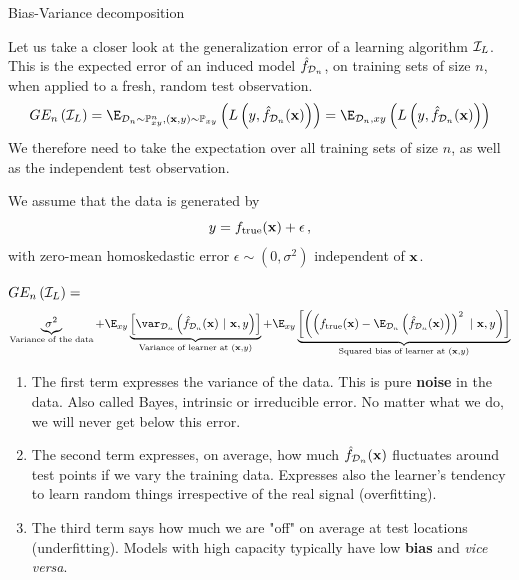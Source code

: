 \documentclass[11pt,compress,t,notes=noshow, xcolor=table]{beamer}
\begin{document}
\begin{vbframe} {Bias-Variance decomposition}

Let us take a closer look at the generalization error of a learning algorithm $\mathcal{I}_{L}$.
This is the expected error of an induced model $\hat{f}_{\mathcal{D}_n}$, on training sets of size $n$, when applied to a fresh, random test observation.
  $$GE_n\left(\ind_{L}\right) = \E_{\D_n \sim \Pxy^n, (\xv, y) \sim \Pxy}\left( L\left(y, \fh_{\D_n}(\xv)\right) \right) = \E_{\D_n, xy}\left( L\left(y, \fh_{\D_n}(\xv)\right) \right)  $$
We therefore need to take the expectation over all training sets of size $n$, as well as the independent test observation.

\lz 

We assume that the data is generated by 
$$
y = f_{\text{true}}(\mathbf{x}) + \epsilon\,,
$$
with zero-mean homoskedastic error $\epsilon \sim (0, \sigma^2)$ independent of $\mathbf{x}$.  

\framebreak 


\begin{footnotesize}
$GE_n\left(\mathcal{I}_{L}\right) =$  
$$
 \underbrace{\sigma^2}_{\text{Variance of the data}} + \E_{xy}\underbrace{\left[\var_{\D_n}\left(\fh_{\D_n}(\xv) ~|~\xv, y\right)\right]}_{\text{Variance of learner at } (\xv, y)} + \E_{xy}\underbrace{\left[\left(\left(\ftrue(\xv)-\E_{\D_n}\left(\fh_{\D_n}(\xv)\right)\right)^2~|~\xv, y\right)\right]}_{\text{Squared bias of learner at } (\xv, y)}  
$$
\end{footnotesize}
\begin{enumerate}
  \item The first term expresses the variance of the data. 
    This is pure \textbf{noise} in the data.
    Also called Bayes, intrinsic or irreducible error.
    No matter what we do, we will never get below this error.
  \item The second term expresses, on average, how much $\hat{f}_{\mathcal{D}_n}(\mathbf{x})$ fluctuates around test points if we vary the training data. Expresses also the learner's tendency to learn random things irrespective of the real signal (overfitting).
  \item The third term says how much we are "off" on average at test locations (underfitting).
    Models with high capacity typically have low \textbf{bias} and \textit{vice versa}.
\end{enumerate}








\end{vbframe}
\end{document}
